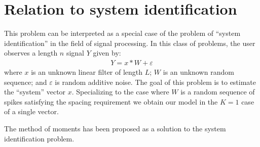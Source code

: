 \documentclass{article}
\theoremstyle{thm}
\theoremstyle{definition}
\newcommand{\ep}{\varepsilon}
\newcommand{\1}{\mathbf{1}}
\begin{document}
%
%
%
%

\section{Relation to system identification}

This problem can be interpreted as a special case of the problem of ``system identification'' in the field of signal processing. In this class of problems, the user observes a length $n$ signal $Y$ given by:
%
\begin{align}
%
    Y = x \ast W + \ep
%
\end{align}
%
where $x$ is an unknown linear filter of length $L$; $W$ is an unknown random sequence; and $\ep$ is random additive noise. The goal of this problem is to estimate the ``system'' vector $x$. Specializing to the case where $W$ is a random sequence of spikes satisfying the spacing requirement we obtain our model in the $K=1$ case of a single vector.

The method of moments has been proposed as a solution to the system identification problem.
\end{document}
